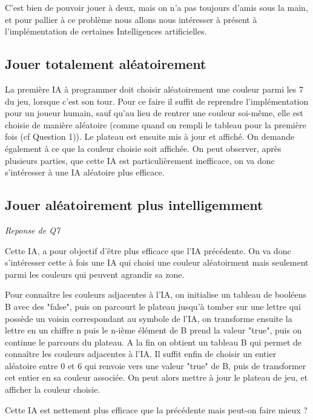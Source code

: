 \documentclass[a4paper,11pt]{article}
\begin{document}
C'est bien de pouvoir jouer à deux, mais on n'a pas toujours d'amis sous la
main, et pour pallier à ce problème nous allons nous intéresser à présent 
à l'implémentation de certaines Intelligences artificielles.

\subsection{Jouer totalement aléatoirement}

La première IA à programmer doit choisir aléatoirement une couleur parmi 
les 7 du jeu, lorsque c'est son tour. Pour ce faire il suffit de reprendre 
l'implémentation pour un joueur humain, sauf qu'au lieu de rentrer une couleur
soi-même, elle est choisie de manière aléatoire (comme quand on rempli le tableau
pour la première fois (cf Question 1)). Le plateau est ensuite mis à jour 
et affiché. On demande également à ce que la couleur choisie soit affichée.
On peut observer, après plusieurs parties, que cette IA est particulièrement 
inefficace, on va donc s'intéresser à une IA aléatoire plus efficace.


\subsection{Jouer aléatoirement plus intelligemment}
\emph{Reponse de Q7}

Cette IA, a pour objectif d'être plus efficace que l'IA précédente. On va donc
s'intéresser cette à fois une IA qui choisi une couleur aléatoirment mais 
seulement parmi les couleurs qui peuvent agrandir sa zone. 

Pour connaître les couleurs adjacentes à l'IA, on initialise un tableau de
booléens B avec des "false", puis on parcourt le plateau jusqu'à tomber sur une lettre qui possède 
un voisin correspondant au symbole de l'IA, on transforme ensuite la lettre 
en un chiffre n puis le n-ième élément de B prend la valeur "true", puis on continue
le parcours du plateau. A la fin on obtient un tableau B qui permet de connaître
les couleurs adjacentes à l'IA. Il suffit enfin de choisir un entier aléatoire entre 
0 et 6 qui renvoie vers une valeur "true" de B, puis de transformer cet entier
en sa couleur associée. On peut alors mettre à jour le plateau de jeu, et afficher la
couleur choisie.

Cette IA est nettement plus efficace que la précédente mais peut-on faire mieux ?

\end{document}
